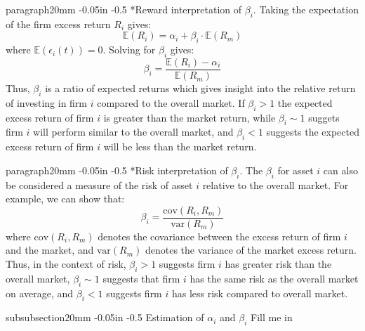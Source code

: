 \documentclass[11pt]{article}
\makeatletter
\theoremstyle{definition}
\renewcommand\subsubsection{\@startsection
	{subsubsection}{2}{0mm}
	{-0.05in}
	{-0.5\baselineskip}
	{\normalfont\normalsize\itshape\bfseries}}
\renewcommand\paragraph{\@startsection
	{paragraph}{2}{0mm}
	{-0.05in}
	{-0.5\baselineskip}
	{\normalfont\normalsize\itshape}}
\makeatother
\begin{document}
\paragraph*{Reward interpretation of $\beta_{i}$.} Taking the expectation of the firm excess return $R_{i}$ gives:
\begin{equation*}
\mathbb{E}\left(R_{i}\right) = \alpha_{i}+\beta_{i}\cdot\mathbb{E}\left(R_{m}\right)
\end{equation*}
where $\mathbb{E}\left(\epsilon_{i}\left(t\right)\right) = 0$. Solving for $\beta_{i}$ gives:
\begin{equation*}
\beta_{i} = \frac{\mathbb{E}\left(R_{i}\right) - \alpha_{i}}{\mathbb{E}\left(R_{m}\right)}
\end{equation*}
Thus, $\beta_{i}$ is a ratio of expected returns which gives insight into the relative return of investing in firm $i$ 
compared to the overall market. If $\beta_{i}>1$ the expected excess return of firm $i$ is greater than the market return,
while $\beta_{i}\sim{1}$ suggets firm $i$ will perform similar to the overall market, 
and $\beta_{i}<1$ suggests the expected excess return of firm $i$ will be less than the market return.

\paragraph*{Risk interpretation of $\beta_{i}$.} The $\beta_{i}$ for asset $i$ can also be considered a measure of the risk of asset $i$ relative to the overall market. 
For example, we can show that:
\begin{equation*}
\beta_{i} = \frac{\text{cov}(R_{i}, R_{m})}{\text{var}(R_{m})}
\end{equation*}
where $\text{cov}(R_{i}, R_{m})$ denotes the covariance between the excess return of firm $i$ and the market, 
and $\text{var}(R_{m})$ denotes the variance of the market excess return. 
Thus, in the context of risk, $\beta_{i}>1$ suggests firm $i$ has greater risk than the overall market,
$\beta_{i}\sim{1}$ suggests that firm $i$ has the same risk as the overall market on average, and 
$\beta_{i}<1$ suggests firm $i$ has less risk compared to overall market.

\subsubsection{Estimation of $\alpha_{i}$ and $\beta_{i}$}\label{subsec:estimation-of-alpha-beta}
Fill me in
\end{document}
